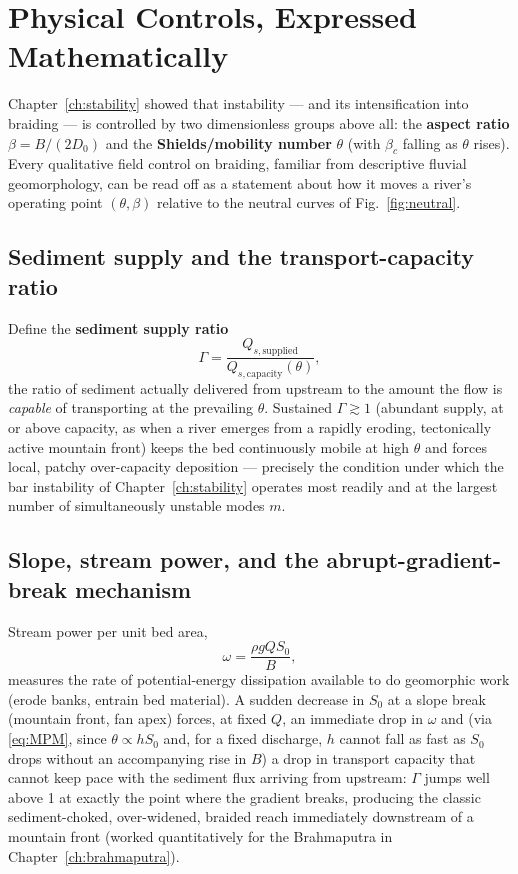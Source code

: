\documentclass[11pt,a4paper]{report}
\theoremstyle{definition}
\theoremstyle{plain}
\theoremstyle{remark}
\begin{document}
\chapter{Physical Controls, Expressed Mathematically}
\label{ch:physical}

Chapter~\ref{ch:stability} showed that instability --- and its intensification into braiding --- is controlled by two dimensionless groups above all: the \textbf{aspect ratio} $\beta=B/(2D_0)$ and the \textbf{Shields/mobility number} $\theta$ (with $\beta_c$ falling as $\theta$ rises). Every qualitative field control on braiding, familiar from descriptive fluvial geomorphology, can be read off as a statement about how it moves a river's operating point $(\theta,\beta)$ relative to the neutral curves of Fig.~\ref{fig:neutral}.

\section{Sediment supply and the transport-capacity ratio}
Define the \textbf{sediment supply ratio}
\begin{equation}
\Gamma = \frac{Q_{s,\text{supplied}}}{Q_{s,\text{capacity}}(\theta)},
\end{equation}
the ratio of sediment actually delivered from upstream to the amount the flow is \emph{capable} of transporting at the prevailing $\theta$. Sustained $\Gamma\gtrsim1$ (abundant supply, at or above capacity, as when a river emerges from a rapidly eroding, tectonically active mountain front) keeps the bed continuously mobile at high $\theta$ and forces local, patchy over-capacity deposition --- precisely the condition under which the bar instability of Chapter~\ref{ch:stability} operates most readily and at the largest number of simultaneously unstable modes $m$.

\section{Slope, stream power, and the abrupt-gradient-break mechanism}
Stream power per unit bed area,
\begin{equation}
\omega = \frac{\rho g Q S_0}{B},
\end{equation}
measures the rate of potential-energy dissipation available to do geomorphic work (erode banks, entrain bed material). A sudden decrease in $S_0$ at a slope break (mountain front, fan apex) forces, at fixed $Q$, an immediate drop in $\omega$ and (via \eqref{eq:MPM}, since $\theta\propto h S_0$ and, for a fixed discharge, $h$ cannot fall as fast as $S_0$ drops without an accompanying rise in $B$) a drop in transport capacity that cannot keep pace with the sediment flux arriving from upstream: $\Gamma$ jumps well above 1 at exactly the point where the gradient breaks, producing the classic sediment-choked, over-widened, braided reach immediately downstream of a mountain front (worked quantitatively for the Brahmaputra in Chapter~\ref{ch:brahmaputra}).
\end{document}
